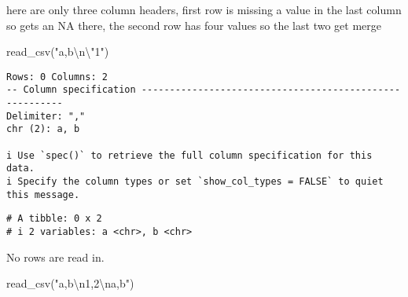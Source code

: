 \documentclass[
  letterpaper,
  DIV=11,
  numbers=noendperiod]{scrreprt}
\newenvironment{Shaded}{\begin{snugshade}}{\end{snugshade}}
\newcommand{\FunctionTok}[1]{\textcolor[rgb]{0.28,0.35,0.67}{#1}}
\newcommand{\NormalTok}[1]{\textcolor[rgb]{0.00,0.23,0.31}{#1}}
\newcommand{\SpecialCharTok}[1]{\textcolor[rgb]{0.37,0.37,0.37}{#1}}
\newcommand{\StringTok}[1]{\textcolor[rgb]{0.13,0.47,0.30}{#1}}
\begin{document}
\begin{enumerate}
\begin{tcolorbox}
  here are only three column headers, first row is missing a value in
  the last column so gets an NA there, the second row has four values so
  the last two get merge

  \end{tcolorbox}

  \begin{tcolorbox}[enhanced jigsaw, left=2mm, rightrule=.15mm, bottomtitle=1mm, opacitybacktitle=0.6, leftrule=.75mm, opacityback=0, colframe=quarto-callout-note-color-frame, bottomrule=.15mm, coltitle=black, toptitle=1mm, colback=white, titlerule=0mm, colbacktitle=quarto-callout-note-color!10!white, title={Answer}, toprule=.15mm, breakable, arc=.35mm]

\begin{Shaded}
\begin{Highlighting}[]
\FunctionTok{read\_csv}\NormalTok{(}\StringTok{"a,b}\SpecialCharTok{\textbackslash{}n\textbackslash{}"}\StringTok{1"}\NormalTok{)}
\end{Highlighting}
\end{Shaded}

\begin{verbatim}
Rows: 0 Columns: 2
-- Column specification --------------------------------------------------------
Delimiter: ","
chr (2): a, b

i Use `spec()` to retrieve the full column specification for this data.
i Specify the column types or set `show_col_types = FALSE` to quiet this message.
\end{verbatim}

\begin{verbatim}
# A tibble: 0 x 2
# i 2 variables: a <chr>, b <chr>
\end{verbatim}

  No rows are read in.

  \end{tcolorbox}

  \begin{tcolorbox}[enhanced jigsaw, left=2mm, rightrule=.15mm, bottomtitle=1mm, opacitybacktitle=0.6, leftrule=.75mm, opacityback=0, colframe=quarto-callout-note-color-frame, bottomrule=.15mm, coltitle=black, toptitle=1mm, colback=white, titlerule=0mm, colbacktitle=quarto-callout-note-color!10!white, title={Answer}, toprule=.15mm, breakable, arc=.35mm]

\begin{Shaded}
\begin{Highlighting}[]
\FunctionTok{read\_csv}\NormalTok{(}\StringTok{"a,b}\SpecialCharTok{\textbackslash{}n}\StringTok{1,2}\SpecialCharTok{\textbackslash{}n}\StringTok{a,b"}\NormalTok{)}
\end{Highlighting}
\end{Shaded}


\end{tcolorbox}
\end{enumerate}
\end{document}
